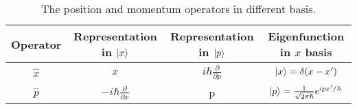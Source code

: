 \documentclass{article}
\theoremstyle{nonumberplain}
\begin{document}
\begin{table}[h]
    \centering
    \begin{tabular}{cccc}
        \toprule
            Operator & Representation in $\ket{x}$ & Representation in $\ket{p}$ & Eigenfunction in $x$ basis    \\
        \midrule
            $\hat{x} $ & $x$ & $i \hbar \frac{\partial }{\partial p} $ & $\ket{x} = \delta (x-x^\prime )$    \\
            $\hat{p} $ & $-i \hbar  \frac{\partial }{\partial x} $ & p & $\ket{p}= \frac{1}{\sqrt{2 \pi \hbar }} e^{i p x^\prime /\hbar } $  \\
        \bottomrule
    \end{tabular}
    \caption{The position and momentum operators in different basis. }
    \label{tab:xp}
\end{table}
\end{document}
